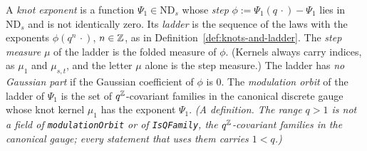 \begin{definition}
\label{def:modulation-orbit}
\leanok
{}
A \emph{knot exponent} is a function $\Psi_1 \in \mathrm{ND}_s$ whose \emph{step}
$\phi := \Psi_1(q\,\cdot) - \Psi_1$ lies in $\mathrm{ND}_s$ and is not identically zero. Its
\emph{ladder} is the sequence of the laws with the exponents $\phi(q^n\,\cdot)$, $n \in \mathbb{Z}$, as in
Definition~\ref{def:knots-and-ladder}. The \emph{step measure} $\mu$ of the ladder is the folded
\Levy{} measure of $\phi$. (Kernels always carry indices, as $\mu_1$ and $\mu_{s,t}$, and the letter
$\mu$ alone is the step measure.) The ladder has \emph{no Gaussian part} if the Gaussian
coefficient of $\phi$ is $0$. The \emph{modulation orbit} of the ladder of $\Psi_1$ is the set of
$q^{\mathbb{Z}}$-covariant families in the canonical discrete gauge whose knot kernel $\mu_1$ has the
exponent $\Psi_1$.
\statusT\quad\emph{(A definition. The range $q > 1$ is not a field of \texttt{modulationOrbit} or
of \texttt{IsQFamily}, the $q^{\mathbb{Z}}$-covariant families in the canonical gauge; every statement that
uses them carries $1 < q$.)}
\end{definition}

